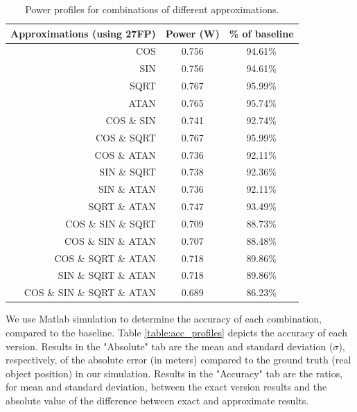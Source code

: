 \begin{table}[h]
\begin{tabular}{r c c}
\toprule
Approximations (using 27FP) & Power (W) & \% of baseline\\
\hline
COS & 						0.756	& 94.61\%\\
SIN & 						0.756	& 94.61\%\\
SQRT & 						0.767	& 95.99\%\\
ATAN & 						0.765	& 95.74\%\\
COS \& SIN & 				0.741	& 92.74\%\\
COS \& SQRT& 				0.767	& 95.99\%\\
COS \& ATAN & 				0.736	& 92.11\%\\
SIN \& SQRT & 				0.738	& 92.36\%\\
SIN \& ATAN & 				0.736	& 92.11\%\\
SQRT \& ATAN & 				0.747	& 93.49\%\\
COS \& SIN \& SQRT & 		0.709	& 88.73\%\\
COS \& SIN \& ATAN& 		0.707	& 88.48\%\\
COS \& SQRT \& ATAN& 		0.718	& 89.86\%\\
SIN \& SQRT \& ATAN  & 		0.718	& 89.86\%\\
COS \& SIN \& SQRT \& ATAN &0.689 	& 86.23\%\\
\hline
\end{tabular}
\caption{Power profiles for combinations of different approximations.}
\label{table:power_profiles_comb}
\end{table}


\par We use Matlab simulation to determine the accuracy of each combination, compared to the baseline. Table \ref{table:acc_profiles} depicts the accuracy of each version. Results in the "Absolute" tab are the mean and standard deviation ($\sigma$), respectively, of the absolute error (in meters) compared to the ground truth (real object position) in our simulation. Results in the "Accuracy" tab are the ratios, for mean and standard deviation, between the exact version results and the absolute value of the difference between exact and approximate results.
    


